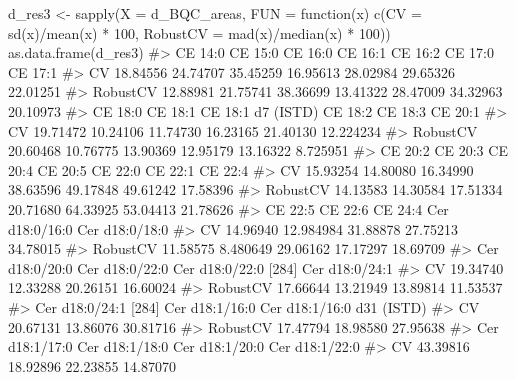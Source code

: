 \documentclass[
  letterpaper,
  DIV=11,
  numbers=noendperiod]{scrreprt}
\newenvironment{Shaded}{\begin{snugshade}}{\end{snugshade}}
\newcommand{\AttributeTok}[1]{\textcolor[rgb]{0.40,0.45,0.13}{#1}}
\newcommand{\CommentTok}[1]{\textcolor[rgb]{0.37,0.37,0.37}{#1}}
\newcommand{\ControlFlowTok}[1]{\textcolor[rgb]{0.00,0.23,0.31}{#1}}
\newcommand{\DecValTok}[1]{\textcolor[rgb]{0.68,0.00,0.00}{#1}}
\newcommand{\FunctionTok}[1]{\textcolor[rgb]{0.28,0.35,0.67}{#1}}
\newcommand{\NormalTok}[1]{\textcolor[rgb]{0.00,0.23,0.31}{#1}}
\newcommand{\OtherTok}[1]{\textcolor[rgb]{0.00,0.23,0.31}{#1}}
\newcommand{\SpecialCharTok}[1]{\textcolor[rgb]{0.37,0.37,0.37}{#1}}
\begin{document}
\begin{Shaded}
\begin{Highlighting}[]
\NormalTok{d\_res3 }\OtherTok{\textless{}{-}} \FunctionTok{sapply}\NormalTok{(}\AttributeTok{X =}\NormalTok{ d\_BQC\_areas, }
                 \AttributeTok{FUN =} \ControlFlowTok{function}\NormalTok{(x) }\FunctionTok{c}\NormalTok{(}\AttributeTok{CV =} \FunctionTok{sd}\NormalTok{(x)}\SpecialCharTok{/}\FunctionTok{mean}\NormalTok{(x) }\SpecialCharTok{*} \DecValTok{100}\NormalTok{,}
                                     \AttributeTok{RobustCV =} \FunctionTok{mad}\NormalTok{(x)}\SpecialCharTok{/}\FunctionTok{median}\NormalTok{(x) }\SpecialCharTok{*} \DecValTok{100}\NormalTok{))}
\FunctionTok{as.data.frame}\NormalTok{(d\_res3)}
\CommentTok{\#\textgreater{}           CE 14:0  CE 15:0  CE 16:0  CE 16:1  CE 16:2  CE 17:0  CE 17:1}
\CommentTok{\#\textgreater{} CV       18.84556 24.74707 35.45259 16.95613 28.02984 29.65326 22.01251}
\CommentTok{\#\textgreater{} RobustCV 12.88981 21.75741 38.36699 13.41322 28.47009 34.32963 20.10973}
\CommentTok{\#\textgreater{}           CE 18:0  CE 18:1 CE 18:1 d7 (ISTD)  CE 18:2  CE 18:3   CE 20:1}
\CommentTok{\#\textgreater{} CV       19.71472 10.24106          11.74730 16.23165 21.40130 12.224234}
\CommentTok{\#\textgreater{} RobustCV 20.60468 10.76775          13.90369 12.95179 13.16322  8.725951}
\CommentTok{\#\textgreater{}           CE 20:2  CE 20:3  CE 20:4  CE 20:5  CE 22:0  CE 22:1  CE 22:4}
\CommentTok{\#\textgreater{} CV       15.93254 14.80080 16.34990 38.63596 49.17848 49.61242 17.58396}
\CommentTok{\#\textgreater{} RobustCV 14.13583 14.30584 17.51334 20.71680 64.33925 53.04413 21.78626}
\CommentTok{\#\textgreater{}           CE 22:5   CE 22:6  CE 24:4 Cer d18:0/16:0 Cer d18:0/18:0}
\CommentTok{\#\textgreater{} CV       14.96940 12.984984 31.88878       27.75213       34.78015}
\CommentTok{\#\textgreater{} RobustCV 11.58575  8.480649 29.06162       17.17297       18.69709}
\CommentTok{\#\textgreater{}          Cer d18:0/20:0 Cer d18:0/22:0 Cer d18:0/22:0 [284] Cer d18:0/24:1}
\CommentTok{\#\textgreater{} CV             19.34740       12.33288             20.26151       16.60024}
\CommentTok{\#\textgreater{} RobustCV       17.66644       13.21949             13.89814       11.53537}
\CommentTok{\#\textgreater{}          Cer d18:0/24:1 [284] Cer d18:1/16:0 Cer d18:1/16:0 d31 (ISTD)}
\CommentTok{\#\textgreater{} CV                   20.67131       13.86076                  30.81716}
\CommentTok{\#\textgreater{} RobustCV             17.47794       18.98580                  27.95638}
\CommentTok{\#\textgreater{}          Cer d18:1/17:0 Cer d18:1/18:0 Cer d18:1/20:0 Cer d18:1/22:0}
\CommentTok{\#\textgreater{} CV             43.39816       18.92896       22.23855       14.87070}

\end{Highlighting}
\end{Shaded}
\end{document}
